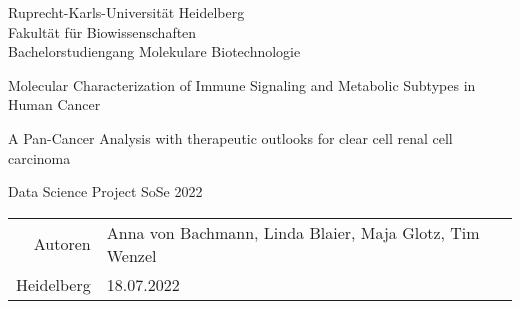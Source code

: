 \documentclass[
  parskip,
  oneside]{scrreprt}
\author{}
\date{\vspace{-2.5em}}
\begin{document}
\begin{titlepage}
\centering
    {\Large Ruprecht-Karls-Universität Heidelberg\\
        Fakultät für Biowissenschaften\\
        Bachelorstudiengang Molekulare Biotechnologie\\}

    {}
    {

        {\huge Molecular Characterization of Immune Signaling and Metabolic Subtypes in Human Cancer}

        {\Huge }
        
        {\LARGE A Pan-Cancer Analysis with therapeutic outlooks for clear cell renal cell carcinoma}

    }

    {\Large Data Science Project SoSe 2022}


    {\Large
        \begin{tabular}{rl}
            Autoren & Anna von Bachmann, Linda Blaier, Maja Glotz, Tim Wenzel\\
            Heidelberg &18.07.2022\\
        \end{tabular}
    }


\end{titlepage}


\tableofcontents


\small
\end{document}
